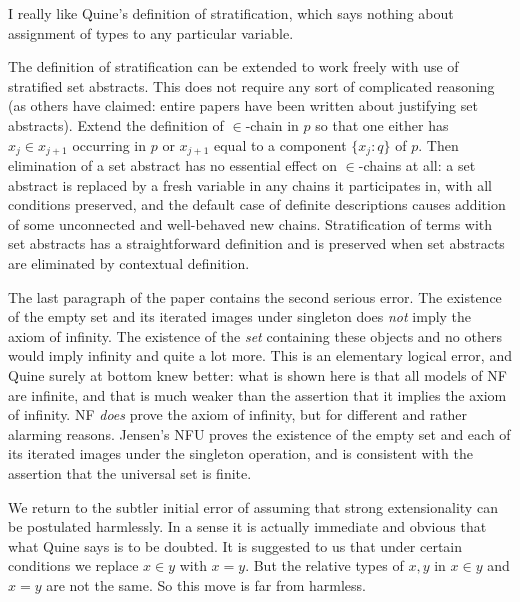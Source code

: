 \documentclass[12pt]{article}
\begin{document}
I really like Quine's definition of stratification, which says nothing about assignment of types to any particular variable.

The definition of stratification can be extended to work freely with use of stratified set abstracts.  This does not require any sort of complicated reasoning (as others have claimed:  entire papers have been written about justifying set abstracts).   Extend the definition of $\in$-chain in $p$ so that one either has $x_j \in x_{j+1}$ occurring in $p$ or $x_{j+1}$ equal to a component $\{x_j:q\}$ of $p$.  Then elimination of a set abstract has no essential effect on $\in$-chains at all:  a set abstract is replaced by a fresh variable in any chains it participates in, with all conditions preserved, and the default case of definite descriptions causes addition of some unconnected and well-behaved new chains.  Stratification of terms with set abstracts has a straightforward definition and is preserved when set abstracts are eliminated by contextual definition.

The last paragraph of the paper contains the second serious error.  The existence of the empty set and its iterated images under singleton does {\em not\/} imply the axiom of infinity.  The existence of the {\em set\/} containing these objects and no others would imply infinity and quite a lot more.  This is an elementary logical error, and Quine surely at bottom knew better:  what is shown here is that all models of NF are infinite, and that is much weaker than the assertion that it implies the axiom of infinity.  NF {\em does\/} prove the axiom of infinity, but for different and rather alarming reasons.  Jensen's NFU proves the existence of the empty set and each of its iterated images under the singleton operation, and is consistent with the assertion that the universal set is finite.

We return to the subtler initial error of assuming that strong extensionality can be postulated harmlessly.   In a sense it is actually immediate and obvious that what Quine says is to be doubted.  It is suggested to us that under certain conditions we replace $x \in y$ with $x=y$.  But the relative types of $x,y$ in $x \in y$ and $x=y$ are not the same.  So this move is far from harmless.   
\end{document}
